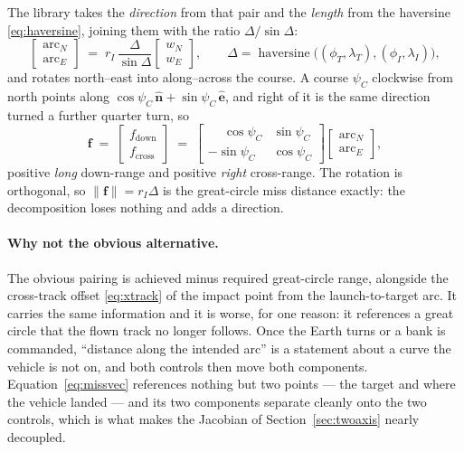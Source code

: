 \documentclass[11pt]{article}
\newcommand{\nhat}{\hat{\mathbf{n}}}
\newcommand{\ehat}{\hat{\mathbf{e}}}
\begin{document}
The library takes the \emph{direction} from that pair and the \emph{length}
from the haversine \eqref{eq:haversine}, joining them with the ratio
$\Delta/\sin\Delta$:
\begin{equation}
  \begin{bmatrix} \text{arc}_N \\ \text{arc}_E \end{bmatrix}
  \;=\; r_I\,\frac{\Delta}{\sin\Delta}
  \begin{bmatrix} w_N \\ w_E \end{bmatrix},
  \qquad
  \Delta = \operatorname{haversine}\bigl((\phi_T,\lambda_T),(\phi_I,\lambda_I)\bigr),
  \label{eq:arcNE}
\end{equation}
and rotates north--east into along--across the course. A course $\psi_C$
clockwise from north points along $\cos\psi_C\,\nhat + \sin\psi_C\,\ehat$, and
right of it is the same direction turned a further quarter turn, so
\begin{equation}
  \mathbf{f} \;=\;
  \begin{bmatrix} f_{\text{down}} \\ f_{\text{cross}} \end{bmatrix}
  \;=\;
  \begin{bmatrix}
    \phantom{-}\cos\psi_C & \sin\psi_C \\
    -\sin\psi_C & \cos\psi_C
  \end{bmatrix}
  \begin{bmatrix} \text{arc}_N \\ \text{arc}_E \end{bmatrix},
  \label{eq:missvec}
\end{equation}
positive \emph{long} down-range and positive \emph{right} cross-range. The
rotation is orthogonal, so $\|\mathbf{f}\| = r_I\Delta$ is the great-circle
miss distance exactly: the decomposition loses nothing and adds a direction.

\paragraph{Why not the obvious alternative.} The obvious pairing is achieved
minus required great-circle range, alongside the cross-track offset
\eqref{eq:xtrack} of the impact point from the launch-to-target arc. It
carries the same information and it is worse, for one reason: it references a
great circle that the flown track no longer follows. Once the Earth turns or a
bank is commanded, ``distance along the intended arc'' is a statement about a
curve the vehicle is not on, and both controls then move both components.
Equation~\eqref{eq:missvec} references nothing but two points --- the target
and where the vehicle landed --- and its two components separate cleanly onto
the two controls, which is what makes the Jacobian of
Section~\ref{sec:twoaxis} nearly decoupled.
\end{document}
